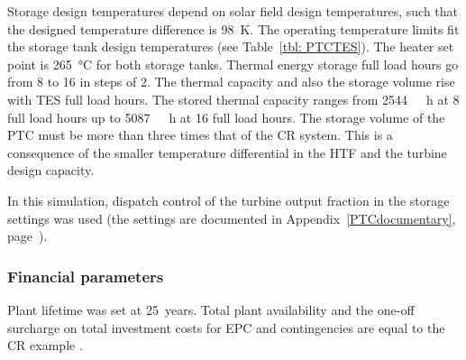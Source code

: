 Storage design temperatures depend on solar field design temperatures, such that the designed temperature difference is \SI{98}{K}. The operating temperature limits fit the storage tank design temperatures (see Table~\ref{tbl: PTCTES}). The heater set point is \SI{265}{\celsius} for both storage tanks. Thermal energy storage full load hours go from \num{8} to \num{16} in steps of \num{2}. The thermal capacity and also the storage volume rise with TES full load hours. The stored thermal capacity ranges from \SI{2544}{\mega\wattth\hour} at \num{8} full load hours up to \SI{5087}{\mega\wattth\hour} at \num{16} full load hours. The storage volume of the PTC must be more than three times that of the CR system. This is a consequence of the smaller temperature differential in the HTF and the turbine design capacity.

In this simulation, dispatch control of the turbine output fraction in the storage settings was used (the settings are documented in Appendix~\ref{PTCdocumentary}, page~\pageref{PTC_turbineoutput}). 

\subsubsection{Financial parameters}
Plant lifetime was set at \SI{25}{years}. Total plant availability and the one-off surcharge on total investment costs for EPC and contingencies are equal to the CR example \cite{Platzer2014}.

